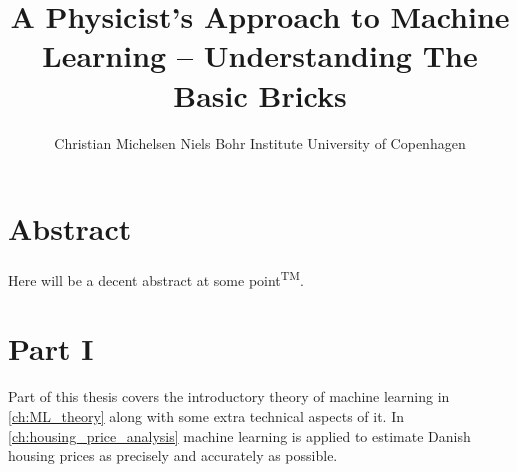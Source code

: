 \documentclass[a4paper, twoside, nobib, justified]{tufte-book} %
\title[A Physicist's Approach To Machine Learning -- Understanding The Basic Bricks]{A Physicist's \newline \noindent 
       Approach to \newline \noindent 
       Machine Learning \newline \noindent
       --  \newline \noindent
       Understanding  \newline \noindent
       The Basic Bricks}
\author[Christian Michelsen]{\newline \noindent 
        Christian Michelsen \newline \noindent 
        Niels Bohr Institute \newline \noindent 
        University of Copenhagen \newline }
\newcommand{\RNum}[1]{\uppercase\expandafter{\romannumeral #1\relax}}
\begin{document}
\begin{titlepage}
  
\end{titlepage}



\chapter*{Abstract}
Here will be a decent abstract at some point\textsuperscript{TM}.


\cleardoublepage
{}
{}

\vspace{-5cm}
\tableofcontents

\cleardoublepage





\mainmatter




\chapter*{Part I}

Part \RNum{1} of this thesis covers the introductory theory of machine learning in \autoref{ch:ML_theory} along with some extra technical aspects of it. In \autoref{ch:housing_price_analysis} machine learning is applied to estimate Danish housing prices as precisely and accurately as possible.  
\end{document}
